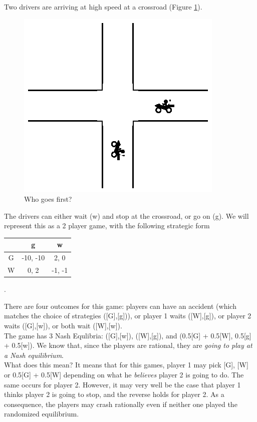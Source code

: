 \begin{example}
Two drivers are arriving at high speed at a crossroad (Figure \ref{ch6:fig:crossroads}).
\begin{figure}[!ht]
\centering
\includegraphics[scale=1.5]{crossroads.eps}
\caption{Who goes first?}
\label{ch6:fig:crossroads}
\end{figure}
The drivers can either wait (w) and stop at the crossroad, or go on (g). 
We will represent this as a 2 player game, with the following strategic form 
\begin{center}
\begin{tabular}{c | c  c}
& g & w\\
\hline
G & -10, -10 & 2, 0  \\
W & 0, 2 & -1, -1 
\end{tabular}
.
\end{center}

There are four outcomes for this game: players can have an accident (which matches the choice of strategies ([G],[g])), or player 1 waits ([W],[g]), or player 2 waits ([G],[w]), or both wait ([W],[w]). \\
The game has 3 Nash Equlibria: ([G],[w]), ([W],[g]), and (0.5[G] + 0.5[W], 0.5[g] + 0.5[w]). We know that, since the players are rational, they are \emph{going to play at a Nash equilibrium}. \\
What does this mean? It means that for this games, player 1 may pick [G], [W] or 0.5[G] + 0.5[W] depending on what he \emph{believes} player 2 is going to do. The same occurs for player 2. 
However, it may very well be the case that player 1 thinks player 2 is going to stop, and the reverse holds for player 2. As a consequence, the players may crash rationally even if neither one played the randomized equilibrium.


\end{example}
